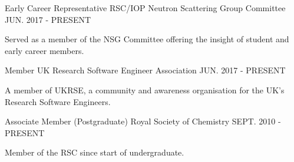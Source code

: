 \begin{cventries}
  \cventry
  	{Early Career Representative}
    {RSC/IOP Neutron Scattering Group Committee}
    {}
    {JUN. 2017 - PRESENT}
    {
      \begin{cvitems}
      	\item {Served as a member of the NSG Committee offering the insight of student and early career members.}
	  \end{cvitems}
	}
  \cventry
    {Member}
    {UK Research Software Engineer Association}
    {}
    {JUN. 2017 - PRESENT}
    {
	  \begin{cvitems}
	  	\item{A member of UKRSE, a community and awareness organisation for the UK's Research Software Engineers.}
	  \end{cvitems}
    }
  \cventry
    {Associate Member (Postgraduate)}
    {Royal Society of Chemistry}
    {}
    {SEPT. 2010 - PRESENT}
    {
      \begin{cvitems}
      	\item {Member of the RSC since start of undergraduate.}
      \end{cvitems}
    }
\end{cventries}
